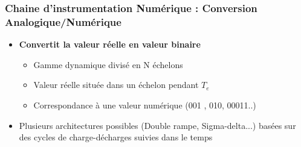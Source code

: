 \documentclass{beamer}
\begin{document}
\begin{frame}
\frametitle{Chaine d'instrumentation Numérique : Conversion Analogique/Numérique}
\begin{center}
\end{center}
\vspace{0.1cm}
\begin{itemize}
\item \textbf{Convertit la valeur réelle en valeur binaire}
\vspace{0.2cm}
\begin{itemize}
\item Gamme dynamique divisé en N échelons  
\vspace{0.2cm}
\item Valeur réelle située dans un échelon pendant $T_e$
\vspace{0.2cm}
\item Correspondance à une valeur numérique (001 , 010, 00011..)
\end{itemize}
\vspace{0.2cm}
\item Plusieurs architectures possibles (Double rampe, Sigma-delta...) basées sur des cycles de charge-décharges suivies dans le temps
\end{itemize}
\end{frame}
\end{document}
